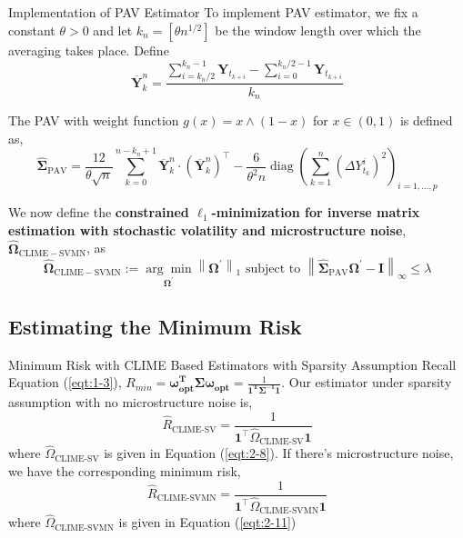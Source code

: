 \documentclass{beamer}
\begin{document}
\begin{frame}{Implementation of PAV Estimator}
To implement PAV estimator, we fix a constant $\theta >0$ and let $k_n = [\theta n^{1/2}]$ be the window length over which the averaging takes place. Define
$$
\overline{\mathbf{Y}}_k^n=\frac{\sum_{i=k_n / 2}^{k_n-1} \mathbf{Y}_{t_{k+i}}-\sum_{i=0}^{k_n / 2-1} \mathbf{Y}_{t_{k+i}}}{k_n}
$$

The PAV with weight function $g(x)=x \wedge(1-x)$ for $x \in(0,1)$ is defined as,
\begin{equation}
\label{eqt:2-10}
\widehat{\boldsymbol{\Sigma}}_{\mathrm{PAV}}=\frac{12}{\theta \sqrt{n}} \sum_{k=0}^{n-k_n+1} \overline{\mathbf{Y}}_k^n \cdot\left(\overline{\mathbf{Y}}_k^n\right)^{\top}-\frac{6}{\theta^2 n} \operatorname{diag}\left(\sum_{k=1}^n\left(\Delta Y_{t_k}^i\right)^2\right)_{i=1, \ldots, p}
\end{equation}

We now define the \textbf{constrained $\ell_1$-minimization for inverse matrix estimation with stochastic volatility and microstructure noise}, $\widehat{\boldsymbol{\Omega}}_{\mathrm{CLIME}-\mathrm{SVMN}}$, as
\begin{equation}
\label{eqt:2-11}
\widehat{\boldsymbol{\Omega}}_{\mathrm{CLIME}-\mathrm{SVMN}}:=\underset{\boldsymbol{\Omega}^{\prime}}{\arg \min }\left\|\boldsymbol{\Omega}^{\prime}\right\|_1 \text { subject to }\left\|\widehat{\boldsymbol{\Sigma}}_{\mathrm{PAV}} \boldsymbol{\Omega}^{\prime}-\mathbf{I}\right\|_{\infty} \leq \lambda
\end{equation}
\end{frame}

\subsection{Estimating the Minimum Risk}
\begin{frame}{Minimum Risk with CLIME Based Estimators with Sparsity Assumption}
Recall Equation (\ref{eqt:1-3}), $R_{min}= \bm{\omega^T_{opt}\Sigma \omega_{opt}} = \frac{1}{\bm{1^T\Sigma^{-1}1}}$. Our estimator under sparsity assumption with no microstructure noise is,
\begin{equation}
\label{eqt:2-12}
\widehat{R}_{\text{CLIME-SV}}=\frac{1}{\mathbf{1}^{\top} \widehat{\Omega}_{\text{CLIME-SV}} \mathbf{1}}
\end{equation}
where $\widehat{\Omega}_{\text{CLIME-SV}}$ is given in Equation (\ref{eqt:2-8}). If there's microstructure noise, we have the corresponding minimum risk,
\begin{equation}
\label{eqt:2-13}
\widehat{R}_{\text{CLIME-SVMN}}=\frac{1}{\mathbf{1}^{\top} \widehat{\Omega}_{\text{CLIME-SVMN}} \mathbf{1}}
\end{equation}
where $\widehat{\Omega}_{\text{CLIME-SVMN}}$ is given in Equation (\ref{eqt:2-11})
\end{frame}
\end{document}
